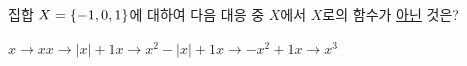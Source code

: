 집합 $X=\{-1{,}\mkern3mu\mathopen{}0{,}\mkern3mu\mathopen{}1\}$에 대하여 다음 대응 중 $X$에서 $X$로의 함수가 \underline{아닌} 것은?
\begin{choices32}{$x\longrightarrow x$}{$x\longrightarrow |x|+1$}{$x\longrightarrow x^2-|x|+1$}{$x\longrightarrow -x^2+1$}{$x\longrightarrow x^3$}\end{choices32}
